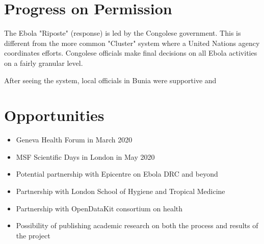 \documentclass[a4paper,12pt,twoside]{article}
\begin{document}
\section{Progress on Permission}

The Ebola "Riposte" (response) is led by the Congolese government. This is different from the more common "Cluster" system where a United Nations agency coordinates efforts. Congolese officials make final decisions on all Ebola activities on a fairly granular level.

After seeing the system, local officials in Bunia were supportive and 


\section{Opportunities}
\begin{itemize}
    \item Geneva Health Forum in March 2020
    \item MSF Scientific Days in London in May 2020
    \item Potential partnership with Epicentre on Ebola DRC and beyond
    \item Partnership with London School of Hygiene and Tropical Medicine
    \item Partnership with OpenDataKit consortium on health
    \item Possibility of publishing academic research on both the process and results of the project
    
\end{itemize}
\end{document}
